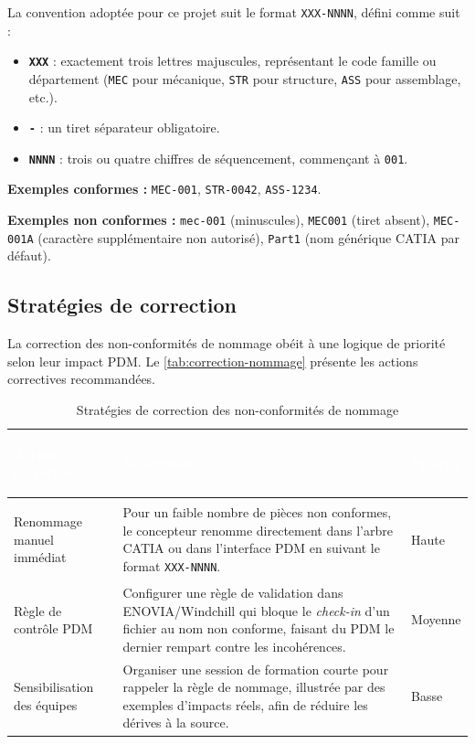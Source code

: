 La convention adoptée pour ce projet suit le format \texttt{XXX-NNNN}, défini comme suit :

\begin{itemize}
    \item[•] \textbf{\texttt{XXX}} : exactement trois lettres majuscules, représentant le code famille ou département (\texttt{MEC} pour mécanique, \texttt{STR} pour structure, \texttt{ASS} pour assemblage, etc.).
    \item[•] \textbf{\texttt{-}} : un tiret séparateur obligatoire.
    \item[•] \textbf{\texttt{NNNN}} : trois ou quatre chiffres de séquencement, commençant à \texttt{001}.
\end{itemize}

\noindent\textbf{Exemples conformes :} \texttt{MEC-001}, \texttt{STR-0042}, \texttt{ASS-1234}.

\noindent\textbf{Exemples non conformes :} \texttt{mec-001} (minuscules), \texttt{MEC001} (tiret absent), \texttt{MEC-001A} (caractère supplémentaire non autorisé), \texttt{Part1} (nom générique CATIA par défaut).

\subsection{Stratégies de correction}

La correction des non-conformités de nommage obéit à une logique de priorité selon leur impact PDM. Le \autoref{tab:correction-nommage} présente les actions correctives recommandées.

\begin{table}[H]
    \centering
    \caption{Stratégies de correction des non-conformités de nommage}
    \label{tab:correction-nommage}
    \begin{tabularx}{\textwidth}{|>{\bfseries\raggedright\arraybackslash}p{3.5cm}|X|>{\centering\arraybackslash}p{2.2cm}|}
        \hline
        \rowcolor{headerblue}
        \textcolor{white}{\textbf{Action corrective}} & \centering\textcolor{white}{\textbf{Description}} & \textcolor{white}{\textbf{Priorité}} \tabularnewline
        \hline
        \rowcolor{rowlight}
        Renommage manuel immédiat & Pour un faible nombre de pièces non conformes, le concepteur renomme directement dans l'arbre CATIA ou dans l'interface PDM en suivant le format \texttt{XXX-NNNN}. & Haute \\
        \hline
        \rowcolor{rowlight}
        Règle de contrôle PDM & Configurer une règle de validation dans ENOVIA/Windchill qui bloque le \textit{check-in} d'un fichier au nom non conforme, faisant du PDM le dernier rempart contre les incohérences. & Moyenne \\
        \hline
        \rowcolor{rowwhite}
        Sensibilisation des équipes & Organiser une session de formation courte pour rappeler la règle de nommage, illustrée par des exemples d'impacts réels, afin de réduire les dérives à la source. & Basse \\
        \hline
    \end{tabularx}
\end{table}

